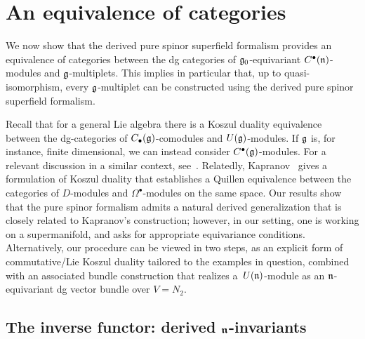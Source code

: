\documentclass[11pt]{article}
\numberwithin{equation}{section}
\numberwithin{equation}{section}
\def\bu{\bullet}
\begin{document}
\section{An equivalence of categories} \label{sec: equiv}
We now show that the derived pure spinor superfield formalism provides an equivalence of categories between the dg categories of $\mathfrak g_0$-equivariant $C^\bullet(\mathfrak n)$-modules and $\mathfrak g$-multiplets. This implies in particular that, up to quasi-isomorphism, every $\mathfrak g$-multiplet can be constructed using the derived pure spinor superfield formalism.

\begin{rmk}
	Recall that for a general Lie algebra there is a Koszul duality equivalence between the dg-categories of $C_\bullet(\mathfrak g)$-comodules and $U(\mathfrak g)$-modules. If $\mathfrak g$ is, for instance, finite dimensional, we can instead consider $C^\bullet(\mathfrak g)$-modules. For a relevant discussion in a similar context, see~\mbox{\cite[Sections~7 and~8]{CostelloYangian}}. Relatedly, Kapranov~\cite{Kapranov} gives a formulation of Koszul duality that establishes a Quillen equivalence between the categories of $D$-modules and $\Omega^\bu$-modules on the same space. Our results show that the pure spinor formalism admits a natural derived generalization that is closely related to Kapranov's construction; however, in our setting, one is working on a supermanifold, and asks for appropriate equivariance conditions. Alternatively, our procedure can be viewed in two steps, as an explicit form of commutative/Lie Koszul duality tailored to the examples in question, combined with an associated bundle construction that realizes a~$U(\mathfrak n)$-module as an $\mathfrak n$-equivariant dg vector bundle over $V = N_2$.
\end{rmk}

\subsection[The inverse functor: derived n-invariants]{The inverse functor: derived $\boldsymbol{\mathfrak n}$-invariants}
\end{document}
